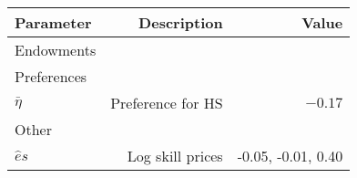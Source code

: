 \begin{tabular}{lrr}
\hline
Parameter & Description  & Value  \\
\hline
Endowments &   &   \\
Preferences &   &   \\
$\bar{\eta}$ & Preference for HS  & $-0.17$  \\
Other &   &   \\
$\hat{e}{s}$ & Log skill prices  & -0.05, -0.01, 0.40  \\
\hline
\end{tabular}%
